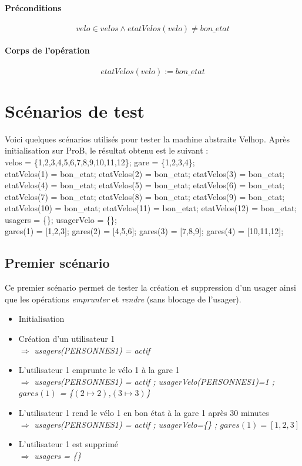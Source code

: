 \documentclass[12pt]{article}
\begin{document}
\paragraph{Préconditions}
\[ velo \in velos \land etatVelos(velo) \neq bon\_etat \]
\paragraph{Corps de l'opération}
\[ etatVelos(velo) := bon\_etat \]
\newpage
\section{Scénarios de test}
Voici quelques scénarios utilisés pour tester la machine abstraite Velhop. Après initialisation sur ProB, le résultat obtenu est le suivant : \\
velos = \{1,2,3,4,5,6,7,8,9,10,11,12\};
gare = \{1,2,3,4\}; \\
etatVelos(1) = bon\_etat;
etatVelos(2) = bon\_etat;
etatVelos(3) = bon\_etat;
etatVelos(4) = bon\_etat;
etatVelos(5) = bon\_etat;
etatVelos(6) = bon\_etat;
etatVelos(7) = bon\_etat;
etatVelos(8) = bon\_etat;
etatVelos(9) = bon\_etat;
etatVelos(10) = bon\_etat;
etatVelos(11) = bon\_etat;
etatVelos(12) = bon\_etat;  \\
usagers = \{\};
usagerVelo = \{\}; \\
gares(1) = [1,2,3];
gares(2) = [4,5,6];
gares(3) = [7,8,9];
gares(4) = [10,11,12];
\subsection{Premier scénario}
Ce premier scénario permet de tester la création et suppression d'un usager ainsi que les opérations \textit{emprunter} et \textit{rendre} (sans blocage de l'usager).
\begin{itemize}
  \item Initialisation
  \item Création d'un utilisateur 1 \\
  $\Rightarrow$ \textit{usagers(PERSONNES1) = actif}
  \item L'utilisateur 1 emprunte le vélo 1 à la gare 1 \\
  $\Rightarrow$ \textit{usagers(PERSONNES1) = actif ; usagerVelo(PERSONNES1)=1 ; $gares(1)$ = \{$(2\mapsto2)$,$(3\mapsto3)$\}}
  \item L'utilisateur 1 rend le vélo 1 en bon état à la gare 1 après 30 minutes \\
  $\Rightarrow$ \textit{usagers(PERSONNES1) = actif ; usagerVelo=\{\} ; $gares(1) = [1,2,3]$}
  \item L'utilisateur 1 est supprimé \\
  $\Rightarrow$ \textit{usagers = \{\}}
\end{itemize}
\end{document}
